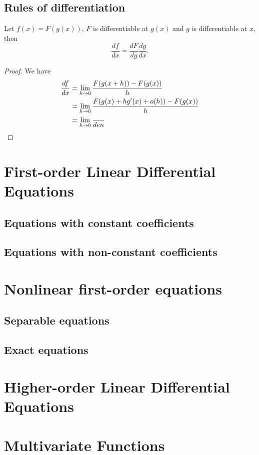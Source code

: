\documentclass[main.tex]{subfiles}
\begin{document}
				\subsection{Rules of differentiation}
			\begin{theorem}
				Let $f(x) = F(g(x))$, $F$ is differentiable at $g(x)$ and $g$ is differentiable at $x$, then
				\begin{equation*}
					\frac{df}{dx} = \frac{dF}{dg}\frac{dg}{dx}.
				\end{equation*}
			\end{theorem}	
			\begin{proof}
				We have
				\begin{align*}
				\frac{df}{dx} & = \lim_{h \rightarrow 0} \frac{F(g(x + h)) - F(g(x))}{h} \\
							& = \lim_{h \rightarrow 0} \frac{F(g(x) + hg'(x) + o(h)) - F(g(x))}{h}\\
							& = \lim_{h \rightarrow 0} \frac{}{den}
				\end{align*}
			\end{proof}
		
		\section[1st-order LDEs]{First-order Linear Differential Equations}
			\subsection{Equations with constant coefficients}
				
			\subsection{Equations with non-constant coefficients}
				
		\section{Nonlinear first-order equations}
			\subsection{Separable equations}
			
			\subsection{Exact equations}
		\section[Higher-order LDEs]{Higher-order Linear Differential Equations}
		
		\section{Multivariate Functions}
			
\end{document}
